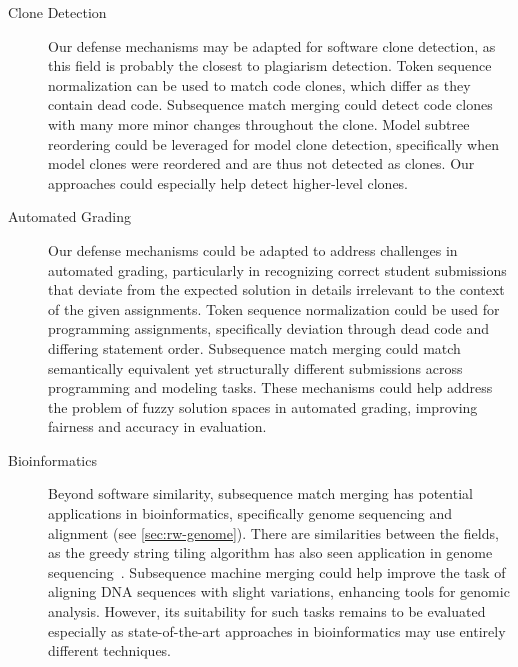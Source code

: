 \begin{description}
    \item[Clone Detection]
    Our defense mechanisms may be adapted for software clone detection, as this field is probably the closest to plagiarism detection. Token sequence normalization can be used to match code clones, which differ as they contain dead code. Subsequence match merging could detect code clones with many more minor changes throughout the clone. Model subtree reordering could be leveraged for model clone detection, specifically when model clones were reordered and are thus not detected as clones. Our approaches could especially help detect higher-level clones. 

    \item[Automated Grading]
    Our defense mechanisms could be adapted to address challenges in automated grading, particularly in recognizing correct student submissions that deviate from the expected solution in details irrelevant to the context of the given assignments.
    Token sequence normalization could be used for programming assignments, specifically deviation through dead code and differing statement order.
    Subsequence match merging could match semantically equivalent yet structurally different submissions across programming and modeling tasks. These mechanisms could help address the problem of fuzzy solution spaces in automated grading, improving fairness and accuracy in evaluation.

    \item[Bioinformatics]
    Beyond software similarity, subsequence match merging has potential applications in bioinformatics, specifically genome sequencing and alignment (see \autoref{sec:rw-genome}). There are similarities between the fields, as the greedy string tiling algorithm has also seen application in genome sequencing~\cite{Wise1995}.
    Subsequence machine merging could help improve the task of aligning DNA sequences with slight variations, enhancing tools for genomic analysis. However, its suitability for such tasks remains to be evaluated especially as state-of-the-art approaches in bioinformatics may use entirely different techniques.
\end{description}